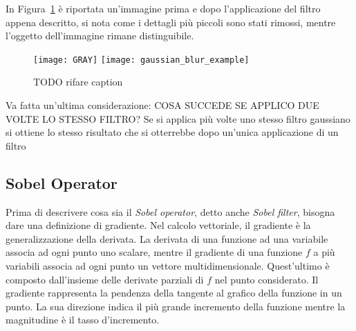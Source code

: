 
In Figura~\ref{fig:gaussian_blur_example} è riportata un'immagine prima e dopo l'applicazione del filtro appena descritto, si nota come i dettagli più piccoli sono stati rimossi, mentre l'oggetto dell'immagine rimane distinguibile.

\begin{figure}[ht] %
  \begin{center}
    \texttt{[image: GRAY]}
    \texttt{[image: gaussian\_blur\_example]}
    \label{fig:gaussian_blur_example}
    \caption{TODO rifare caption}
  \end{center}
\end{figure}

Va fatta un'ultima considerazione: COSA SUCCEDE SE APPLICO DUE VOLTE LO STESSO FILTRO?
Se si applica più volte uno stesso filtro gaussiano si ottiene lo stesso risultato che si otterrebbe dopo un'unica applicazione di un filtro 





\clearpage
\subsection {Sobel Operator}
Prima di descrivere cosa sia il \textit{Sobel operator}, detto anche \textit{Sobel filter}, bisogna dare una definizione di gradiente.
Nel calcolo vettoriale, il gradiente è la generalizzazione della derivata.
La derivata di una funzione ad una variabile associa ad ogni punto uno scalare, mentre il gradiente di una funzione $f$ a più variabili associa ad ogni punto un vettore multidimensionale.
Quest'ultimo è composto dall'insieme delle derivate parziali di $f$ nel punto considerato.
Il gradiente rappresenta la pendenza della tangente al grafico della funzione in un punto.
La sua direzione indica il più grande incremento della funzione mentre la magnitudine è il tasso d'incremento.

